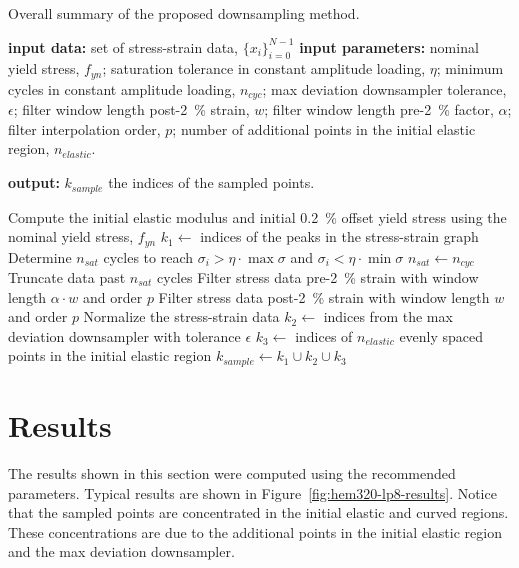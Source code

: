 \documentclass[a4paper,11pt]{article}
\begin{document}
\begin{algorithm}
	\caption{Overall summary of the proposed downsampling method.}
	\label{alg:overall-summary}
	\begin{algorithmic}[1]
        \State \textbf{input data:} set of stress-strain data, $\{x_i\}_{i=0}^{N-1}$
        \State \textbf{input parameters:} nominal yield stress, $f_{yn}$; saturation tolerance in constant amplitude loading, $\eta$; minimum cycles in constant amplitude loading, $n_{cyc}$; max deviation downsampler tolerance, $\epsilon$; filter window length post-2~\% strain, $w$; filter window length pre-2~\% factor, $\alpha$; filter interpolation order, $p$; number of additional points in the initial elastic region, $n_{elastic}$.

        \State \textbf{output:} $k_{sample}$ the indices of the sampled points.
        \bigskip

        \State Compute the initial elastic modulus and initial 0.2~\% offset yield stress using the nominal yield stress, $f_{yn}$
        \State $k_{1} \gets $ indices of the peaks in the stress-strain graph
            \State Determine $n_{sat}$ cycles to reach $\sigma_i > \eta \cdot \max \sigma$ and $\sigma_i < \eta \cdot \min \sigma$
                \State $n_{sat} \gets n_{cyc}$
            \EndIf
            \State Truncate data past $n_{sat}$ cycles
        \EndIf
        \State Filter stress data pre-2~\% strain with window length $\alpha \cdot w$ and order $p$
        \State Filter stress data post-2~\% strain with window length $w$ and order $p$
        \State Normalize the stress-strain data
        \State $k_2 \gets$ indices from the max deviation downsampler with tolerance $\epsilon$
        \State $k_3 \gets$ indices of $n_{elastic}$ evenly spaced points in the initial elastic region
        \State $k_{sample} \gets k_1 \cup k_2 \cup k_3$
    \end{algorithmic}
\end{algorithm}

\section{Results}

The results shown in this section were computed using the recommended parameters.
Typical results are shown in Figure~\ref{fig:hem320-lp8-results}.
Notice that the sampled points are concentrated in the initial elastic and curved regions.
These concentrations are due to the additional points in the initial elastic region and the max deviation downsampler.
\end{document}
